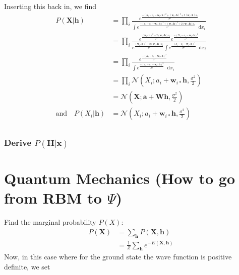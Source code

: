\documentclass[norsk,a4paper,11pt]{article}
\newcommand*\diff{\mathop{}\!\mathrm{d}}
\newcommand{\VX}{\mathbf{X}}
\newcommand{\Vx}{\mathbf{x}}
\newcommand{\VH}{\mathbf{H}}
\newcommand{\Vh}{\mathbf{h}}
\newcommand{\VW}{\mathbf{W}}
\newcommand{\Vwi}{\mathbf{w}_{i*}}
\newcommand{\Va}{\mathbf{a}}
\begin{document}
Inserting this back in, we find
\begin{align}
	P(\VX | \Vh) &= \prod_i \frac{e^{\frac{-(X_i - a_i- \Vwi \Vh)^2 + (\Vwi  \Vh)^2 + 2(\Vwi \Vh)a_i}{\sigma^2}}}{\int e^{\frac{-(x_i - a_i- \Vwi \Vh)^2 + (\Vwi  \Vh)^2 + 2(\Vwi \Vh)a_i}{\sigma^2}} \diff x_i } \\
	&= \prod_i \frac{e^{\frac{(\Vwi  \Vh)^2 + 2(\Vwi \Vh)a_i}{\sigma^2}}e^{\frac{-(X_i - a_i- \Vwi \Vh)^2}{\sigma^2}}}{e^{\frac{(\Vwi  \Vh)^2 + 2(\Vwi \Vh)a_i}{\sigma^2}}\int e^{\frac{-(x_i - a_i- \Vwi \Vh)^2}{\sigma^2}} \diff x_i } \\
	&= \prod_i \frac{e^{\frac{-(X_i - a_i- \Vwi \Vh)^2}{\sigma^2}}}{\int e^{\frac{-(x_i - a_i- \Vwi \Vh)^2}{\sigma^2}} \diff x_i } \\
	&= \prod_i \mathcal{N} (X_i ;  a_i + \Vwi \Vh,  \frac{\sigma^2}{2}) \\
	&= \mathcal{N} (\VX ; \Va + \VW \Vh, \frac{\sigma^2}{2}) \\
	\text{and} \quad P(X_i | \Vh) &= \mathcal{N} (X_i ;  a_i + \Vwi \Vh,  \frac{\sigma^2}{2}) \\
\end{align}

\subsubsection{Derive $P(\VH | \Vx)$}


\section{Quantum Mechanics (How to go from RBM to $\Psi$)}
Find the marginal probability $P(X)$:
\begin{align}
	P(\mathbf{X}) &= \sum_\mathbf{h} P(\mathbf{X}, \mathbf{h}) \\
				&= \frac{1}{Z}\sum_\mathbf{h} e^{-E(\mathbf{X}, \mathbf{h})}
\end{align}
Now, in this case where for the ground state the wave function is positive definite, we set

\color{Green}
\end{document}
